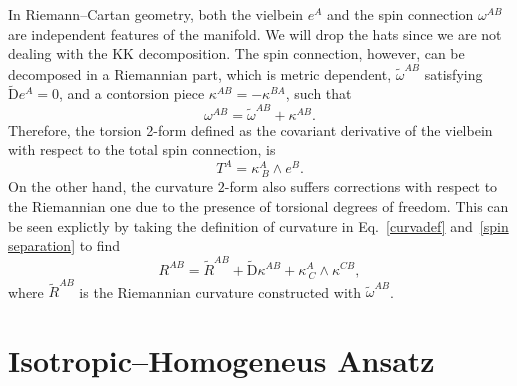 \documentclass[aps,prd,12pt,superscriptaddress,showpacs,showkeys,longbibliography,reprint,nofootinbib]{revtex4-1}
\begin{document}
In Riemann--Cartan geometry, both the vielbein $e^A$ and the spin connection $\omega^{AB}$ are independent features of the manifold. We will drop the hats since we are not dealing with the KK decomposition. The spin connection, however, can be decomposed in a Riemannian part, which is metric dependent, $\tilde{\omega}^{AB}$ satisfying $\tilde{\mbox{D}}e^A=0$, and a contorsion piece $\kappa^{AB}=-\kappa^{BA}$, such that 
\begin{equation}\label{spin separation}
  \omega^{AB}=\tilde{\omega}^{AB}+\kappa^{AB}.
\end{equation} 
Therefore, the torsion 2-form defined as the covariant derivative of the vielbein with respect to the total spin connection, is
\begin{equation}
  T^A=\kappa^A_{\ B}\wedge e^B.
\end{equation}
On the other hand, the curvature $2$-form also suffers corrections with respect to the Riemannian one due to the presence of torsional degrees of freedom. This can be seen explictly by taking the definition of curvature in Eq.~\eqref{curvadef} and~\eqref{spin separation} to find
\begin{equation}\label{curvature decomp}
  R^{AB} = \tilde{R}^{AB} + \tilde{\mbox{D}}\kappa^{AB} + \kappa^A_{\ C}\wedge\kappa^{CB},
\end{equation}
where $\tilde{R}^{AB}$ is the Riemannian curvature constructed with $\tilde{\omega}^{AB}$.


\section{Isotropic--Homogeneus Ansatz\label{homotropic}}
\end{document}
